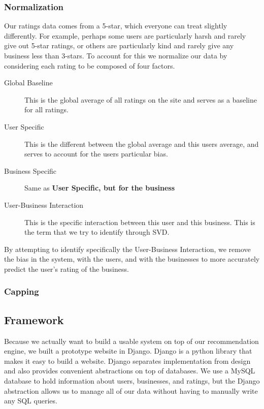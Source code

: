 \subsubsection{Normalization}

Our ratings data comes from a 5-star, which everyone can treat slightly
differently.  For example, perhaps some users are particularly harsh and rarely
give out 5-star ratings, or others are particularly kind and rarely give any
business less than 3-stars. To account for this we normalize our data by
considering each rating to be composed of four factors.

\begin{description}

  \item[Global Baseline] This is the global average of all ratings on the site
and serves as a baseline for all ratings.

  \item[User Specific] This is the different between the global average and
this users average, and serves to account for the users particular bias.

  \item[Business Specific] Same as \bf{User Specific}, but for the business

  \item[User-Business Interaction] This is the specific interaction between this
user and this business. This is the term that we try to identify through SVD. 

\end{description}

By attempting to identify specifically the User-Business Interaction, we remove
the bias in the system, with the users, and with the businesses to more
accurately predict the user's rating of the business. 


\subsubsection{Capping}


\subsection{Framework}

Because we actually want to build a usable system on top of our recommendation
engine, we built a prototype website in Django. Django is a python library that
makes it easy to build a website. Django separates implementation from design
and also provides convenient abstractions on top of databases. We use a MySQL
database to hold information about users, businesses, and ratings, but the
Django abstraction allows us to manage all of our data without having to
manually write any SQL queries.

